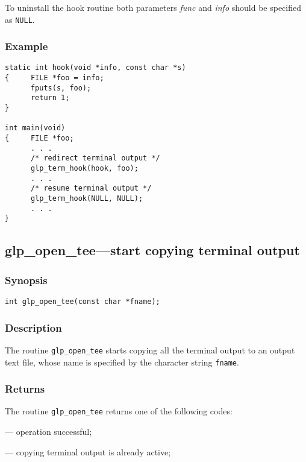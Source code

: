 To uninstall the hook routine both parameters {\it func} and {\it info}
should be specified as \verb|NULL|.

\newpage

\subsubsection*{Example}

\begin{footnotesize}
\begin{verbatim}
static int hook(void *info, const char *s)
{     FILE *foo = info;
      fputs(s, foo);
      return 1;
}

int main(void)
{     FILE *foo;
      . . .
      /* redirect terminal output */
      glp_term_hook(hook, foo);
      . . .
      /* resume terminal output */
      glp_term_hook(NULL, NULL);
      . . .
}
\end{verbatim}
\end{footnotesize}

\subsection{glp\_open\_tee---start copying terminal output}

\subsubsection*{Synopsis}

\begin{verbatim}
int glp_open_tee(const char *fname);
\end{verbatim}

\subsubsection*{Description}

The routine \verb|glp_open_tee| starts copying all the terminal output
to an output text file, whose name is specified by the character string
\verb|fname|.

\subsubsection*{Returns}

The routine \verb|glp_open_tee| returns one of the following codes:

 --- operation successful;

 --- copying terminal output is already active;

